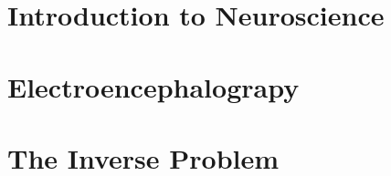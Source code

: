 \documentclass[a4paper, UKenglish, 11pt]{uiomaster}
\begin{document}
%
%
\section{Introduction to Neuroscience}
\section{Electroencephalograpy}
\section{The Inverse Problem}
\end{document}

